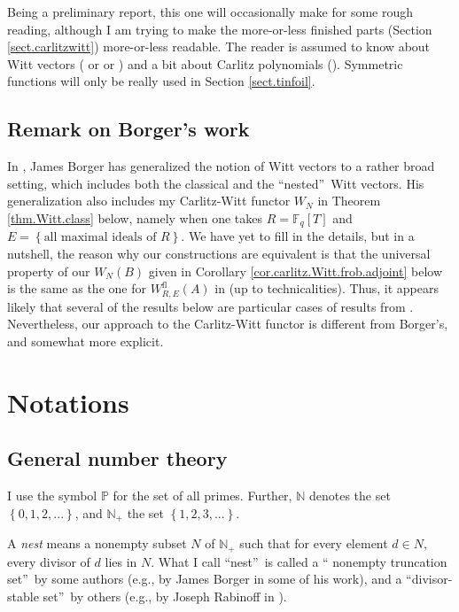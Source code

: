 \documentclass[numbers=enddot,12pt,final,onecolumn,notitlepage]{scrartcl}%
\theoremstyle{definition}
\begin{document}
Being a preliminary report, this one will occasionally make for some rough
reading, although I am trying to make the more-or-less finished parts (Section
\ref{sect.carlitzwitt}) more-or-less readable. The reader is assumed to know
about Witt vectors (\cite{rabinoff-witt} or \cite{hw-witt1} or \cite[\S 1]%
{hesselholt-drw}) and a bit about Carlitz polynomials (\cite{kc-carlitz}).
Symmetric functions will only be really used in Section \ref{sect.tinfoil}.

\subsection{Remark on Borger's work}

In \cite[\S 1--\S 2]{jb-bg1}, James Borger has generalized the notion of Witt
vectors to a rather broad setting, which includes both the classical and the
\textquotedblleft nested\textquotedblright\ Witt vectors. His generalization
also includes my Carlitz-Witt functor $W_{N}$ in Theorem \ref{thm.Witt.class}
below, namely when one takes $R=\mathbb{F}_{q}\left[  T\right]  $ and
$E=\left\{  \text{all maximal ideals of }R\right\}  $. We have yet to fill in
the details, but in a nutshell, the reason why our constructions are
equivalent is that the universal property of our $W_{N}\left(  B\right)  $
given in Corollary \ref{cor.carlitz.Witt.frob.adjoint} below is the same as
the one for $W_{R,E}^{\operatorname*{fl}}\left(  A\right)  $ in
\cite[Proposition 1.9 (c)]{jb-bg1} (up to technicalities). Thus, it appears
likely that several of the results below are particular cases of results from
\cite{jb-bg1}. Nevertheless, our approach to the Carlitz-Witt functor is
different from Borger's, and somewhat more explicit.

\section{\label{sect.nots}Notations}

\subsection{General number theory}

I use the symbol $\mathbb{P}$ for the set of all primes. Further, $\mathbb{N}$
denotes the set $\left\{  0,1,2,...\right\}  $, and $\mathbb{N}_{+}$ the set
$\left\{  1,2,3,...\right\}  $.

A \textit{nest} means a nonempty subset $N$ of $\mathbb{N}_{+}$ such that for
every element $d\in N$, every divisor of $d$ lies in $N$. What I call
\textquotedblleft nest\textquotedblright\ is called a \textquotedblleft
nonempty truncation set\textquotedblright\ by some authors (e.g., by James
Borger in some of his work), and a \textquotedblleft divisor-stable
set\textquotedblright\ by others (e.g., by Joseph Rabinoff in
\cite{rabinoff-witt}).
\end{document}
